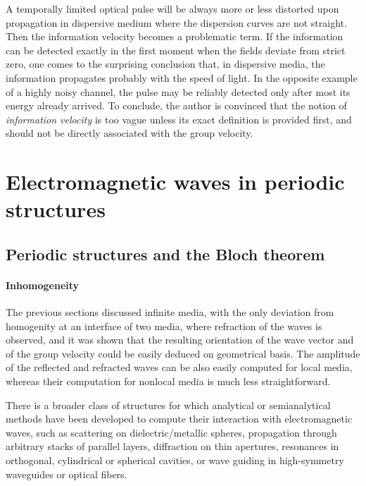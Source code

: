 A temporally limited optical pulse will be always more or less distorted upon propagation in dispersive medium where the dispersion curves are not straight. Then the information velocity becomes a problematic term. If the information can be detected exactly in the first moment when the fields deviate from strict zero, one comes to the surprising conclusion that, in dispersive media, the information propagates probably with the speed of light. In the opposite example of a highly noisy channel, the pulse may be reliably detected only after most its energy already arrived. To conclude, the author is convinced that the notion of \textit{information velocity} is too vague unless its exact definition is provided first, and should not be directly associated with the group velocity. 


\section{Electromagnetic waves in periodic structures}
\subsection{Periodic structures and the Bloch theorem}
\paragraph{Inhomogeneity}%
The previous sections discussed infinite media, with the only deviation from homogenity at an interface of two media, where refraction of the waves is observed, and it was shown that the resulting orientation of the wave vector and of the group velocity could be easily deduced on geometrical basis. The amplitude of the reflected and refracted waves can be also easily computed for local media, whereas their computation for nonlocal media is much less straightforward. 

There is a broader class of structures for which analytical or semianalytical methods have been developed to compute their interaction with electromagnetic waves, such as scattering on dielectric/metallic spheres, propagation through arbitrary stacks of parallel layers, diffraction on thin apertures, resonances in orthogonal, cylindrical or spherical cavities, or wave guiding in high-symmetry waveguides or optical fibers. 

